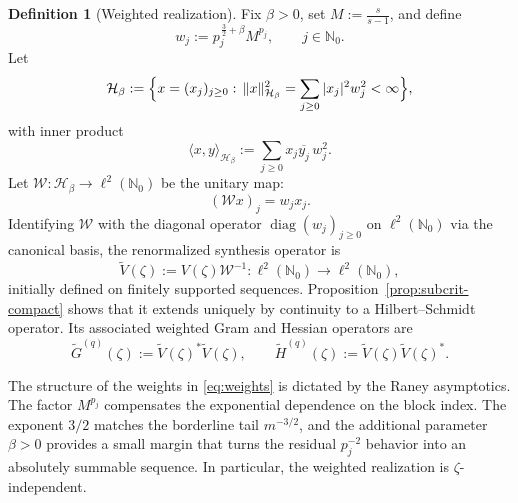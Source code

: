 \documentclass[11pt]{amsart}
\numberwithin{equation}{section}
\theoremstyle{plain}
\theoremstyle{definition}
\newtheorem{definition}[theorem]{Definition}
\theoremstyle{remark}
\newcommand{\NN}{\mathbb{N}}
\begin{document}
\begin{definition}[Weighted realization]
	\label{def:weighted-conj}
	Fix \(\beta>0\), set \(M:=\frac{s}{s-1}\), and define
	\begin{equation}\label{eq:weights}
		w_j:=p_j^{\,\frac32+\beta}M^{p_j},
		\qquad
		j\in\NN_0.
	\end{equation}
	Let
	\begin{equation}\label{eq:weighted-Hilbert}
		\mathcal H_\beta
		:=
		\Bigl\{x=(x_j)_{j\ge0}:\,
		\|x\|_{\mathcal H_\beta}^2
		=
		\sum_{j\ge0}|x_j|^2w_j^2<\infty\Bigr\},
	\end{equation}
	with inner product
	\[
		\langle x,y\rangle_{\mathcal H_\beta}
		:=
		\sum_{j\ge0}x_j\overline{y_j}\,w_j^2.
	\]
	Let \(\mathcal W:\mathcal H_\beta\to\ell^2(\NN_0)\) be the unitary map:
	\[
		(\mathcal Wx)_j=w_jx_j.
	\]
	Identifying \(\mathcal W\) with the diagonal operator
	\(\operatorname{diag}(w_j)_{j\ge0}\) on \(\ell^2(\NN_0)\) via the canonical
	basis, the renormalized synthesis operator is
	\[
		\widetilde V(\zeta):=V(\zeta)\mathcal W^{-1}:\ell^2(\NN_0)\to\ell^2(\NN_0),
	\]
	initially defined on finitely supported sequences.
	Proposition~\ref{prop:subcrit-compact} shows that it extends uniquely by
	continuity to a Hilbert--Schmidt operator. Its associated weighted Gram and
	Hessian operators are
	\begin{equation}\label{eq:Gtilde}
		\widetilde G^{(q)}(\zeta)
		:=
		\widetilde V(\zeta)^*\widetilde V(\zeta),
		\qquad
		\widetilde H^{(q)}(\zeta)
		:=
		\widetilde V(\zeta)\widetilde V(\zeta)^*.
	\end{equation}
\end{definition}

The structure of the weights in \eqref{eq:weights} is dictated by the Raney
asymptotics. The factor \(M^{p_j}\) compensates the exponential dependence on
the block index. The exponent \(3/2\) matches the borderline tail
\(m^{-3/2}\), and the additional parameter \(\beta>0\) provides a small
margin that turns the residual \(p_j^{-2}\) behavior into an absolutely
summable sequence. In particular, the weighted realization is
\(\zeta\)-independent.
\end{document}
